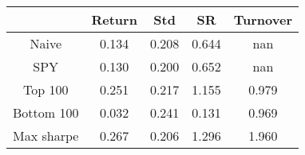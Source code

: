 \begin{table}[]
\begin{tabular}{ccccc}
\hline
             & Return   & Std      & SR       & Turnover \\ \hline
Naive        & 0.134 & 0.208 & 0.644 & nan \\
SPY          & 0.130 & 0.200 & 0.652 & nan \\
Top 100      & 0.251 & 0.217 & 1.155 & 0.979 \\
Bottom 100   & 0.032 & 0.241 & 0.131 & 0.969 \\
Max sharpe   & 0.267 & 0.206 & 1.296 & 1.960 \\
\hline
\end{tabular}
\end{table}
